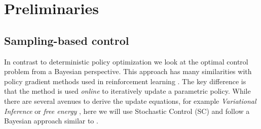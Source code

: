 \section{Preliminaries} \label{sec:theory}

\subsection{Sampling-based control}
In contrast to deterministic policy optimization we look at the optimal control problem from a Bayesian perspective. This approach has many similarities with policy gradient methods used in reinforcement learning \cite{williams1992simple}. The key difference is that the method is used \emph{online} to iteratively update a parametric policy. While there are several avenues to derive the update equations, for example \emph{Variational Inference} \cite{lambert_stein_2020} or \emph{free energy} \cite{williams_information_2017}, here we will use Stochastic Control (SC) and follow a Bayesian approach similar to \cite{levine2018reinforcement}. 

